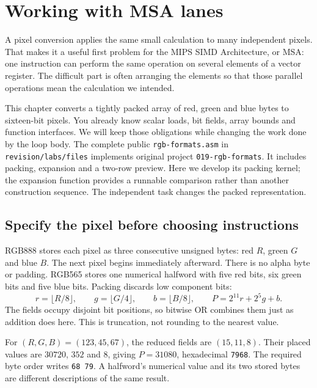 \chapter{Working with MSA lanes}
\label{revision:msa}

A pixel conversion applies the same small calculation to many independent pixels.
That makes it a useful first problem for the MIPS SIMD Architecture, or MSA:
one instruction can perform the same operation on several elements of a vector
register. The difficult part is often arranging the elements so that those
parallel operations mean the calculation we intended.

This chapter converts a tightly packed array of red, green and blue bytes to
sixteen-bit pixels. You already know scalar loads, bit fields, array bounds and
function interfaces. We will keep those obligations while changing the work done
by the loop body. The complete public \texttt{rgb-formats.asm} in
\texttt{revision/labs/files} implements original project \texttt{019-rgb-formats}.
It includes packing, expansion and a two-row preview. Here we develop its packing
kernel; the expansion function provides a runnable comparison rather than another
construction sequence. The independent task changes the packed representation.

\section{Specify the pixel before choosing instructions}

RGB888 stores each pixel as three consecutive unsigned bytes: red $R$, green $G$
and blue $B$. The next pixel begins immediately afterward. There is no alpha byte
or padding. RGB565 stores one numerical halfword with five red bits, six green
bits and five blue bits. Packing discards low component bits:
\[
  r=\lfloor R/8\rfloor,\qquad
  g=\lfloor G/4\rfloor,\qquad b=\lfloor B/8\rfloor,
  \qquad P=2^{11}r+2^5g+b.
\]
The fields occupy disjoint bit positions, so bitwise OR combines them just as
addition does here. This is truncation, not rounding to the nearest value.

For $(R,G,B)=(123,45,67)$, the reduced fields are $(15,11,8)$. Their placed values
are $30720$, $352$ and $8$, giving $P=31080$, hexadecimal \texttt{7968}.
The required byte order writes \texttt{68 79}. A halfword's numerical value and
its two stored bytes are different descriptions of the same result.



